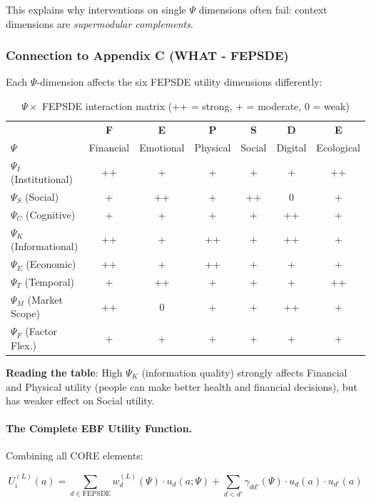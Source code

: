 This explains why interventions on single $\Psi$ dimensions often fail: 
context dimensions are \textit{supermodular complements}.

\subsubsection{Connection to Appendix C (WHAT - FEPSDE)}

Each $\Psi$-dimension affects the six FEPSDE utility dimensions differently:

\begin{table}[h]
\centering
\small
\begin{tabular}{l|cccccc}
\toprule
& \textbf{F} & \textbf{E} & \textbf{P} & \textbf{S} & \textbf{D} & \textbf{E} \\
$\Psi$ & Financial & Emotional & Physical & Social & Digital & Ecological \\
\midrule
$\Psi_I$ (Institutional) & ++ & + & + & + & + & ++ \\
$\Psi_S$ (Social) & + & ++ & + & ++ & 0 & + \\
$\Psi_C$ (Cognitive) & + & + & + & + & ++ & + \\
$\Psi_K$ (Informational) & ++ & + & ++ & + & ++ & + \\
$\Psi_E$ (Economic) & ++ & + & ++ & + & + & + \\
$\Psi_T$ (Temporal) & + & ++ & + & + & + & ++ \\
$\Psi_M$ (Market Scope) & ++ & 0 & + & + & ++ & + \\
$\Psi_F$ (Factor Flex.) & + & + & + & + & + & + \\
\bottomrule
\end{tabular}
\caption{$\Psi \times$ FEPSDE interaction matrix (++ = strong, + = moderate, 0 = weak)}
\label{tab:psi-fepsde}
\end{table}

\textbf{Reading the table}: High $\Psi_K$ (information quality) strongly affects 
Financial and Physical utility (people can make better health and financial 
decisions), but has weaker effect on Social utility.

\paragraph{The Complete EBF Utility Function.}

Combining all CORE elements:

\begin{equation}
U_i^{(L)}(a) = \sum_{d \in \text{FEPSDE}} w_d^{(L)}(\Psi) \cdot u_d(a; \Psi) + 
\sum_{d < d'} \gamma_{dd'}(\Psi) \cdot u_d(a) \cdot u_{d'}(a)
\label{eq:complete-utility}
\end{equation}

